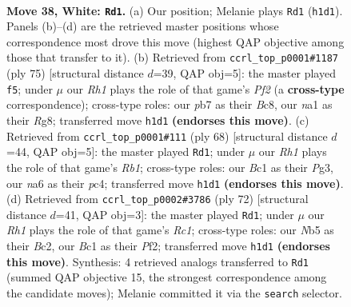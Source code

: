 \documentclass[11pt]{article}
\begin{document}
\clearpage

\begin{figure}[p]\centering
\begin{subfigure}{0.46\textwidth}\centering
\resizebox{\linewidth}{!}{%
\newchessgame
\chessboard[
  setfen={4k1r1/1p2p2p/n5p1/pNp5/5P1P/2P2P2/P5K1/n1B4R w - - 1 38},
  showmover=false,
  pgfstyle=straightmove, color=movearrow, markmove={h1-d1}
]}
\caption{}
\end{subfigure}\hfill
\begin{subfigure}{0.46\textwidth}\centering
\resizebox{\linewidth}{!}{%
\newchessgame
\chessboard[
  setfen={2b3r1/p4p2/2pk4/3p2p1/1P4Pp/PNP2P2/3K3P/6R1 b - - 0 38},
  showmover=false,
  pgfstyle=straightmove, color=movearrow, markmove={f7-f5}
]}
\caption{}
\end{subfigure}
\\[4pt]
\begin{subfigure}{0.46\textwidth}\centering
\resizebox{\linewidth}{!}{%
\newchessgame
\chessboard[
  setfen={2r3k1/3p2p1/p3p2p/P3P3/1pp5/5PP1/1PP3P1/1R4K1 w - - 1 35},
  showmover=false,
  pgfstyle=straightmove, color=movearrow, markmove={b1-d1}
]}
\caption{}
\end{subfigure}\hfill
\begin{subfigure}{0.46\textwidth}\centering
\resizebox{\linewidth}{!}{%
\newchessgame
\chessboard[
  setfen={5k2/r1n3p1/5b1p/2p1pP1P/1pN5/6P1/1PB2PK1/2R5 w - - 3 37},
  showmover=false,
  pgfstyle=straightmove, color=movearrow, markmove={c1-d1}
]}
\caption{}
\end{subfigure}
\caption{\textbf{Move 38, White: \texttt{Rd1}.} (a) Our position; Melanie plays \texttt{Rd1} (\texttt{h1d1}). Panels (b)--(d) are the retrieved master positions whose correspondence most drove this move (highest QAP objective among those that transfer to it). (b) Retrieved from \texttt{ccrl\_top\_p0001\#1187} (ply 75) [structural distance $d$=39, QAP obj=5]: the master played \texttt{f5}; under $\mu$ our \emph{Rh1} plays the role of that game's \emph{Pf2} (a \textbf{cross-type} correspondence); cross-type roles: our \emph{p}b7 as their \emph{B}c8, our \emph{n}a1 as their \emph{R}g8; transferred move \texttt{h1d1} \textbf{(endorses this move)}. (c) Retrieved from \texttt{ccrl\_top\_p0001\#111} (ply 68) [structural distance $d$=44, QAP obj=5]: the master played \texttt{Rd1}; under $\mu$ our \emph{Rh1} plays the role of that game's \emph{Rb1}; cross-type roles: our \emph{B}c1 as their \emph{P}g3, our \emph{n}a6 as their \emph{p}c4; transferred move \texttt{h1d1} \textbf{(endorses this move)}. (d) Retrieved from \texttt{ccrl\_top\_p0002\#3786} (ply 72) [structural distance $d$=41, QAP obj=3]: the master played \texttt{Rd1}; under $\mu$ our \emph{Rh1} plays the role of that game's \emph{Rc1}; cross-type roles: our \emph{N}b5 as their \emph{B}c2, our \emph{B}c1 as their \emph{P}f2; transferred move \texttt{h1d1} \textbf{(endorses this move)}. Synthesis: 4 retrieved analogs transferred to \texttt{Rd1} (summed QAP objective 15, the strongest correspondence among the candidate moves); Melanie committed it via the \texttt{search} selector.}
\label{fig:thought-m74}
\end{figure}
\end{document}

